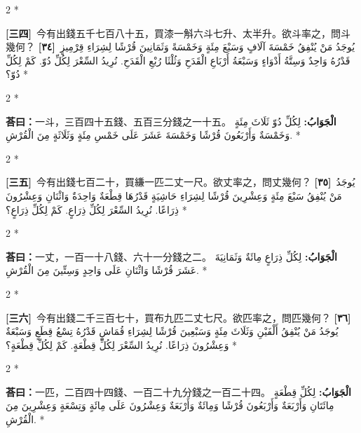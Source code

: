 \documentclass[11pt,a4paper]{article}
\newcommand{\ar}[1]{\arabicfont\beginR #1\endR}
\newcommand{\problemnum}[1]{\textbf{[\ignorespaces#1\unskip]}}
\newenvironment{bilingual}{%
  \begin{paracol}{2}%
  \switchcolumn[0]*%
}{%
  \end{paracol}%
}
\newcommand{\cnline}[1]{\switchcolumn[0]\noindent #1 \switchcolumn[1]}
\newcommand{\arline}[1]{\noindent\ar{#1} \switchcolumn[0]*}
\newenvironment{prob bilingual}{%
  \begin{paracol}{2}%
  \switchcolumn[0]*%
}{%
  \end{paracol}%
  \vspace{0.3em}%
}
\begin{document}
\begin{bilingual}
\cnline{\problemnum{三四}\, 今有出錢五千七百八十五，買漆一斛六斗七升、太半升。欲斗率之，問斗幾何？}
\arline{\problemnum{٣٤}\, يُوجَدُ مَنْ يُنْفِقُ خَمْسَةَ آلَافٍ وَسَبْعَ مِئَةٍ وَخَمْسَةً وَثَمَانِينَ قُرْشًا لِشِرَاءِ قِرْمِيزٍ قَدْرُهُ وَاحِدٌ وَسِتَّةُ أَدْوَاءٍ وَسَبْعَةُ أَرْبَاعِ الْقَدَحِ وَثُلْثَا رُبْعِ الْقَدَحِ. نُرِيدُ السِّعْرَ لِكُلِّ دُوّ. كَمْ لِكُلِّ دُوّ؟}
\end{bilingual}

\begin{bilingual}
\cnline{\textcolor{answercolor}{\textbf{荅曰：}}一斗，三百四十五錢、五百三分錢之一十五。}
\arline{\textcolor{answercolor}{\textbf{الْجَوَابُ:}} لِكُلِّ دُوّ ثَلَاثَ مِئَةٍ وَخَمْسَةٌ وَأَرْبَعُونَ قُرْشًا وَخَمْسَةَ عَشَرَ عَلَى خَمْسِ مِئَةٍ وَثَلَاثَةٍ مِنَ الْقُرْشِ.}
\end{bilingual}

\begin{bilingual}
\cnline{\problemnum{三五}\, 今有出錢七百二十，買縑一匹二丈一尺。欲丈率之，問丈幾何？}
\arline{\problemnum{٣٥}\, يُوجَدُ مَنْ يُنْفِقُ سَبْعَ مِئَةٍ وَعِشْرِينَ قُرْشًا لِشِرَاءِ حَاشِيَةٍ قَدْرُهَا قِطْعَةٌ وَاحِدَةٌ وَاثْنَانِ وَعِشْرُونَ ذِرَاعًا. نُرِيدُ السِّعْرَ لِكُلِّ ذِرَاعٍ. كَمْ لِكُلِّ ذِرَاعٍ؟}
\end{bilingual}

\begin{bilingual}
\cnline{\textcolor{answercolor}{\textbf{荅曰：}}一丈，一百一十八錢、六十一分錢之二。}
\arline{\textcolor{answercolor}{\textbf{الْجَوَابُ:}} لِكُلِّ ذِرَاعٍ مِائَةٌ وَثَمَانِيَةَ عَشَرَ قُرْشًا وَاثْنَانِ عَلَى وَاحِدٍ وَسِتِّينَ مِنَ الْقُرْشِ.}
\end{bilingual}

\begin{bilingual}
\cnline{\problemnum{三六}\, 今有出錢二千三百七十，買布九匹二丈七尺。欲匹率之，問匹幾何？}
\arline{\problemnum{٣٦}\, يُوجَدُ مَنْ يُنْفِقُ أَلْفَيْنِ وَثَلَاثَ مِئَةٍ وَسَبْعِينَ قُرْشًا لِشِرَاءِ قُمَاشٍ قَدْرُهُ تِسْعُ قِطَعٍ وَسَبْعَةٌ وَعِشْرُونَ ذِرَاعًا. نُرِيدُ السِّعْرَ لِكُلِّ قِطْعَةٍ. كَمْ لِكُلِّ قِطْعَةٍ؟}
\end{bilingual}

\begin{bilingual}
\cnline{\textcolor{answercolor}{\textbf{荅曰：}}一匹，二百四十四錢、一百二十九分錢之一百二十四。}
\arline{\textcolor{answercolor}{\textbf{الْجَوَابُ:}} لِكُلِّ قِطْعَةٍ مِائَتَانِ وَأَرْبَعَةٌ وَأَرْبَعُونَ قُرْشًا وَمِائَةٌ وَأَرْبَعَةٌ وَعِشْرُونَ عَلَى مِائَةٍ وَتِسْعَةٍ وَعِشْرِينَ مِنَ الْقُرْشِ.}
\end{bilingual}
\end{document}
